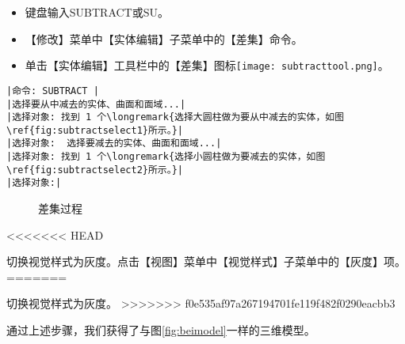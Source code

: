 \begin{procedure}
\begin{itemize}
\item 键盘输入SUBTRACT或SU。
\item 【修改】菜单中【实体编辑】子菜单中的【差集】命令。
\item 单击【实体编辑】工具栏中的【差集】图标\texttt{[image: subtracttool.png]}。
\end{itemize}
\begin{lstlisting}
|命令: SUBTRACT |
|选择要从中减去的实体、曲面和面域...|
|选择对象: 找到 1 个\longremark{选择大圆柱做为要从中减去的实体，如图\ref{fig:subtractselect1}所示。}|
|选择对象:  选择要减去的实体、曲面和面域...|
|选择对象: 找到 1 个\longremark{选择小圆柱做为要减去的实体，如图\ref{fig:subtractselect2}所示。}|
|选择对象:|
\end{lstlisting}
\begin{figure}[htbp]
\centering
{}\hspace{20pt}
\caption{差集过程}
\end{figure}
\showremarks
<<<<<<< HEAD
\item 切换视觉样式为灰度。点击【视图】菜单中【视觉样式】子菜单中的【灰度】项。
=======
\item 切换视觉样式为灰度。
>>>>>>> f0e535af97a267194701fe119f482f0290eacbb3
\end{procedure}

通过上述步骤，我们获得了与图\ref{fig:beimodel}一样的三维模型。
\endinput